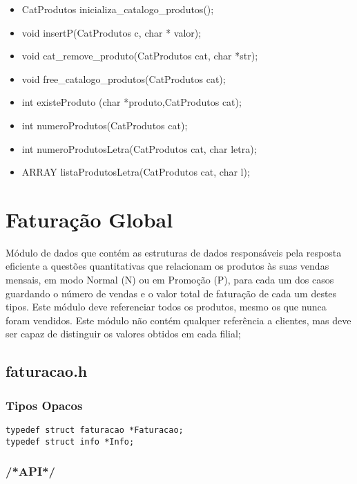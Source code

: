 \begin{itemize}
	
\item CatProdutos inicializa\_catalogo\_produtos();
\item void insertP(CatProdutos c, char * valor);
\item void cat\_remove\_produto(CatProdutos cat, char *str);
\item void free\_catalogo\_produtos(CatProdutos cat);
\item int existeProduto (char *produto,CatProdutos cat);
\item int numeroProdutos(CatProdutos cat);
\item int numeroProdutosLetra(CatProdutos cat, char letra);
\item ARRAY listaProdutosLetra(CatProdutos cat, char l);
\end{itemize}


\section{Faturação Global}

Módulo de dados que contém as estruturas de dados responsáveis pela resposta eficiente a questões quantitativas que relacionam os produtos às suas vendas mensais, em modo Normal (N) ou em Promoção (P), para cada um dos casos guardando o número de vendas e o valor total de faturação de cada um destes tipos. Este módulo deve referenciar todos os produtos, mesmo os que nunca foram vendidos.
Este módulo não contém qualquer referência a clientes, mas deve ser capaz de distinguir os valores obtidos em cada filial; 

\subsection{faturacao.h}

\subsubsection{Tipos Opacos}
\begin{Verbatim}
typedef struct faturacao *Faturacao;
typedef struct info *Info;
\end{Verbatim}

\subsubsection{/*API*/}

